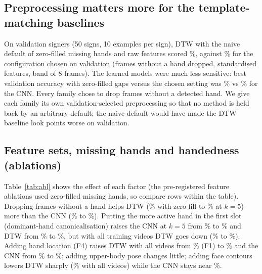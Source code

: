 \subsection{Preprocessing matters more for the template-matching baselines}
On validation signers (50 signs, 10 examples per sign), DTW with the naive default of zero-filled missing hands and raw features
scored \tuneNaiveDtw\%, against \tuneBestDtw\% for the configuration chosen on validation (frames without a hand dropped,
standardised features, band of 8 frames). The learned models were much less sensitive: best validation accuracy with zero-filled
gaps versus the chosen setting was \tuneZeroCnn\% vs \tuneBestCnn\% for the CNN. Every family chose to drop frames without a
detected hand. We give each family its own validation-selected preprocessing so that no method is held back by an arbitrary
default; the naive default would have made the DTW baseline look \tuneGapDtw{} points worse on validation.

\subsection{Feature sets, missing hands and handedness (ablations)}
\begin{table}[t]
\centering\small
\resizebox{\columnwidth}{!}{}
\caption{Top-1 accuracy (\%) at 50 signs by feature set, missing-hand handling and hand slots, for DTW 1-NN and the CNN. Rows without a dagger
were pre-registered and run with the stated settings; rows marked $\dagger$ are an exploratory supplement added after seeing the
main results (see \texttt{PREREG.md}). The F1/drop row is the main setting. Other methods and intervals:
\texttt{results/tables/ablation.md}.}
\label{tab:abl}
\end{table}
Table~\ref{tab:abl} shows the effect of each factor (the pre-registered feature ablations used zero-filled missing hands, so
compare rows within the table). Dropping frames without a hand helps DTW (\ablDtwFOneZeroSlotsKFive\% with zero-fill to
\ablDtwFOneDropSlotsKFive\% at $k=5$) more than the CNN (\ablCnnFOneZeroSlotsKFive\% to \ablCnnFOneDropSlotsKFive\%). Putting the more
active hand in the first slot (dominant-hand canonicalisation) raises the CNN at $k=5$ from \ablCnnFOneZeroSlotsKFive\% to
\ablCnnFOneZeroDominantKFive\% and DTW from \ablDtwFOneZeroSlotsKFive\% to \ablDtwFOneZeroDominantKFive\%, but with all training
videos DTW goes down (\ablDtwFOneZeroSlotsKAll\% to \ablDtwFOneZeroDominantKAll\%). Adding hand location (F4) raises DTW with all
videos from \ablDtwFOneZeroSlotsKAll\% (F1) to \ablDtwFFourZeroSlotsKAll\% and the CNN from \ablCnnFOneZeroSlotsKAll\% to
\ablCnnFFourZeroSlotsKAll\%; adding upper-body pose changes little; adding face contours lowers DTW sharply
(\ablDtwFSixZeroSlotsKAll\% with all videos) while the CNN stays near \ablCnnFSixZeroSlotsKAll\%.

